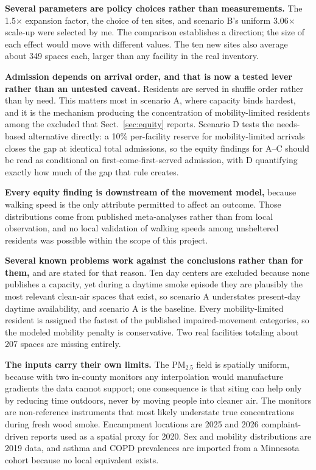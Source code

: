\documentclass[graybox]{svmult}
\begin{document}
\textbf{Several parameters are policy choices rather than measurements.} The
1.5$\times$ expansion factor, the choice of ten sites, and scenario B's uniform
3.06$\times$ scale-up were selected by me. The comparison establishes a
direction; the size of each effect would move with different values. The ten new
sites also average about 349 spaces each, larger than any facility in the real
inventory.

\textbf{Admission depends on arrival order, and that is now a tested lever
rather than an untested caveat.} Residents are served in shuffle order rather
than by need. This matters most in scenario A, where capacity binds hardest,
and it is the mechanism producing the concentration of mobility-limited
residents among the excluded that Sect.~\ref{sec:equity} reports. Scenario D
tests the needs-based alternative directly: a 10\% per-facility reserve for
mobility-limited arrivals closes the gap at identical total admissions, so the
equity findings for A--C should be read as conditional on
first-come-first-served admission, with D quantifying exactly how much of the
gap that rule creates.

\textbf{Every equity finding is downstream of the movement model,} because
walking speed is the only attribute permitted to affect an outcome. Those
distributions come from published meta-analyses rather than from local
observation, and no local validation of walking speeds among unsheltered
residents was possible within the scope of this project.

\textbf{Several known problems work against the conclusions rather than for
them,} and are stated for that reason. Ten day centers are excluded because none
publishes a capacity, yet during a daytime smoke episode they are plausibly the
most relevant clean-air spaces that exist, so scenario A understates present-day
daytime availability, and scenario A is the baseline. Every mobility-limited
resident is assigned the fastest of the published impaired-movement categories,
so the modeled mobility penalty is conservative. Two real facilities totaling
about 207 spaces are missing entirely.

\textbf{The inputs carry their own limits.} The PM$_{2.5}$ field is spatially
uniform, because with two in-county monitors any interpolation would manufacture
gradients the data cannot support; one consequence is that siting can help
only by reducing time outdoors, never by moving people into cleaner air. The
monitors are non-reference instruments that most likely understate true
concentrations during fresh wood smoke. Encampment locations are 2025 and 2026
complaint-driven reports used as a spatial proxy for 2020. Sex and mobility
distributions are 2019 data, and asthma and COPD prevalences are imported from a
Minnesota cohort because no local equivalent exists.
\end{document}
